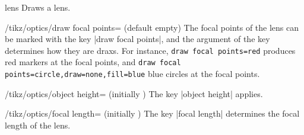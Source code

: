 \documentclass[a4paper]{ltxdoc}
\begin{document}
\begin{shape}{lens}
Draws a lens.

\begin{codeexample}[width=6cm]
\end{codeexample}


\begin{codeexample}[width=6cm]
\end{codeexample}

  \begin{stylekey}{/tikz/optics/draw focal points= (default empty)}
  The focal points of the lens can be marked with the key |draw focal points|, and the argument  of the key determines how they are draxs.
  For instance, \texttt{draw focal points={red}} produces red markers at the focal points, and \texttt{draw focal points={circle,draw=none,fill=blue}} blue circles at the focal points.
  \end{stylekey}

  \begin{codeexample}[width=6cm]
\end{codeexample}

\begin{key}{/tikz/optics/object height= (initially )}
    The key |object height| applies.
\end{key}

\begin{key}{/tikz/optics/focal length= (initially )}
    The key |focal length| determines the focal length of the lens.

    \begin{codeexample}[width=6cm,pre={\tikzset{every lens node/.append style={optics,draw focal points}}}]
    \end{codeexample}
\end{key}



\end{shape}
\end{document}
